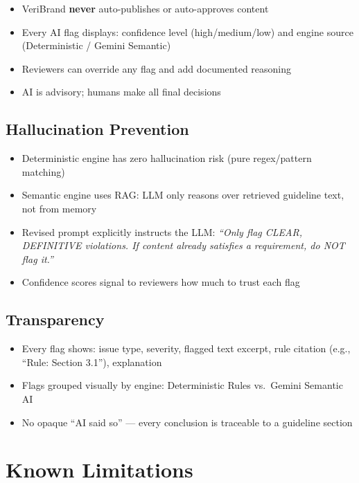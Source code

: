 \documentclass[11pt,a4paper]{article}
\begin{document}
\begin{itemize}
    \item VeriBrand \textbf{never} auto-publishes or auto-approves content
    \item Every AI flag displays: confidence level (high/medium/low) and engine source (Deterministic / Gemini Semantic)
    \item Reviewers can override any flag and add documented reasoning
    \item AI is advisory; humans make all final decisions
\end{itemize}

\subsection{Hallucination Prevention}

\begin{itemize}
    \item Deterministic engine has zero hallucination risk (pure regex/pattern matching)
    \item Semantic engine uses RAG: LLM only reasons over retrieved guideline text, not from memory
    \item Revised prompt explicitly instructs the LLM: \textit{``Only flag CLEAR, DEFINITIVE violations. If content already satisfies a requirement, do NOT flag it.''}
    \item Confidence scores signal to reviewers how much to trust each flag
\end{itemize}

\subsection{Transparency}

\begin{itemize}
    \item Every flag shows: issue type, severity, flagged text excerpt, rule citation (e.g., ``Rule: Section 3.1''), explanation
    \item Flags grouped visually by engine: Deterministic Rules vs.\ Gemini Semantic AI
    \item No opaque ``AI said so'' --- every conclusion is traceable to a guideline section
\end{itemize}

\section{Known Limitations}
\end{document}

